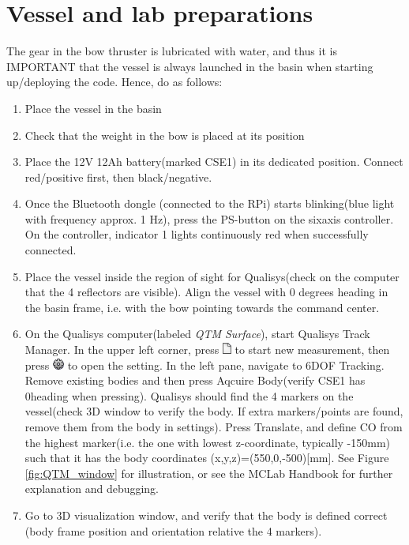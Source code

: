 \section{Vessel and lab preparations}
The gear in the bow thruster is lubricated with water, and thus it is IMPORTANT that the vessel is always launched in the basin when starting up/deploying the code. Hence, do as follows: 
\begin{enumerate}
	\item Place the vessel in the basin
	\item Check that the weight in the bow is placed at its position 
	\item Place the 12V 12Ah battery(marked CSE1) in its dedicated position. Connect red/positive first, then black/negative.  
	\item Once the Bluetooth dongle (connected to the RPi) starts blinking(blue light with frequency approx. 1 Hz), press the PS-button on the sixaxis controller. On the controller, indicator 1 lights continuously red when successfully connected. 
	\item Place the vessel inside the region of sight for Qualisys(check on the computer that the 4 reflectors are visible). Align the vessel with 0 degrees heading in the basin frame, i.e. with the bow pointing towards the command center. 
	\item On the Qualisys computer(labeled \textit{QTM Surface}), start Qualisys Track Manager. In the upper left corner, press \includegraphics{fig/new_measurement.png} to start new measurement, then press \includegraphics{fig/project_options.png} to open the setting. In the left pane, navigate to 6DOF Tracking. Remove existing bodies and then press Aqcuire Body(verify CSE1 has 0\degree heading when pressing). Qualisys should find the 4 markers on the vessel(check 3D window to verify the body. If extra markers/points are found, remove them from the body in settings). Press Translate, and define CO from the highest marker(i.e. the one with lowest z-coordinate, typically -150mm) such that it has the body coordinates (x,y,z)=(550,0,-500)[mm].  See Figure \ref{fig:QTM_window} for illustration, or see the MCLab Handbook for further explanation and debugging. 
	\item Go to 3D visualization window, and verify that the body is defined correct (body frame position and orientation relative the 4 markers).
\end{enumerate}
